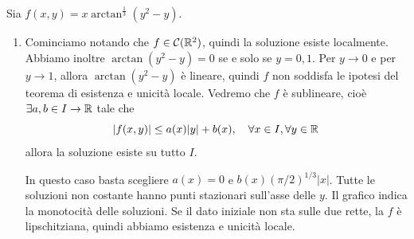 \documentclass[a4paper]{article}
\begin{document}
\begin{snippetsolution}{}
    Sia \(f(x,y) = x\arctan^{\frac13}(y^2 - y)\).
    \begin{enumerate}
        \item Cominciamo notando che \(f \in \mathcal C(\mathbb{R}^2)\),
        quindi la soluzione esiste localmente.
        Abbiamo inoltre \(\arctan(y^2 - y) = 0\) se e solo se \(y=0,1\).
        Per \(y \to 0\) e per \(y \to 1\), allora \(\arctan(y^2 - y)\) è lineare,
        quindi \(f\) non soddisfa le ipotesi del teorema di esistenza e unicità locale.
        Vedremo che \(f\) è sublineare, cioè \(\exists a,b \in I \to \mathbb{R}\) tale che
        \[
            |f(x,y)| \leq a(x)|y| + b(x), \quad \forall x \in I, \forall y \in \mathbb{R}
        \]
        allora la soluzione esiste su tutto \(I\). \\
        \begin{minipage}[t]{0.4\textwidth}
            \vspace{0pt}
            In questo caso basta scegliere \(a(x) = 0\) e \(b(x) (\pi/2)^{1/3}|x|\).
            Tutte le soluzioni non costante hanno punti stazionari sull'asse delle \(y\).
            Il grafico indica la monotocità delle soluzioni.
            Se il dato iniziale non sta sulle due rette, la \(f\) è lipschitziana,
            quindi abbiamo esistenza e unicità locale.
        \end{minipage}
        \begin{minipage}[t]{0.6\textwidth}
            \vspace{0pt}
            \begin{center}
\end{center}
\end{minipage}
\end{enumerate}
\end{snippetsolution}
\end{document}
